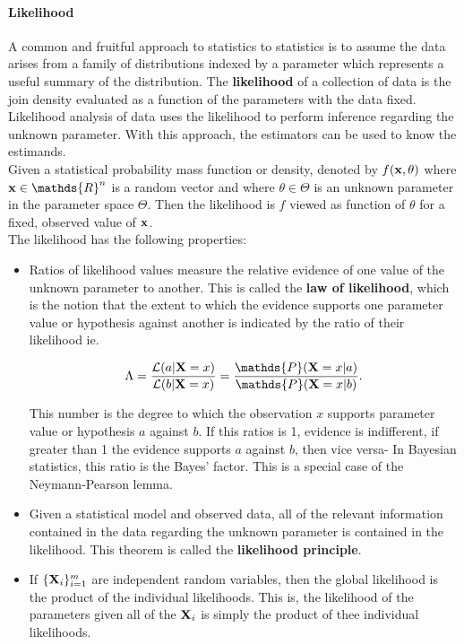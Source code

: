 \documentclass{homework}
\begin{document}
\paragraph{Likelihood}

A common and fruitful approach to statistics to statistics is to assume the data arises from a family of distributions indexed by a parameter which represents a useful summary of the distribution. The \textbf{likelihood} of a collection of data is the join density evaluated as a function of the parameters with the data fixed. Likelihood analysis of data uses the likelihood to perform inference regarding the unknown parameter. With this approach, the estimators can be used to know the estimands. \\

Given a statistical probability mass function or density, denoted by $f({\bf x}, \theta)$ where ${\bf x} \in \mathds{R}^n$ is a random vector and where $\theta \in \Theta$ is an unknown parameter in the parameter space $\Theta$. Then the likelihood is $f$ viewed as function of $\theta$ for a fixed, observed value of ${\bf x}$. \\

The likelihood has the following properties:

\begin{itemize}
    \item Ratios of likelihood values measure the relative evidence of one value of the unknown parameter to another. This is called the \textbf{law of likelihood}, which is the notion that the extent to which the evidence supports one parameter value or hypothesis against another is indicated by the ratio of their likelihood ie.
    
    $$
    \Lambda = \frac{\mathcal{L}(a | {\bf X}=x)}{\mathcal{L}(b | {\bf X}=x)} = \frac{\mathds{P}({\bf X}=x|a)}{\mathds{P}({\bf X}=x|b)}.
    $$
    
    This number is the degree to which the observation $x$ supports parameter value or hypothesis $a$ against $b$. If this ratios is 1, evidence is indifferent, if greater than 1 the evidence supports $a$ against $b$, then vice versa- In Bayesian statistics, this ratio is the Bayes' factor. This is a special case of the Neymann-Pearson lemma. \\
    \item Given a statistical model and observed data, all of the relevant information contained in the data regarding the unknown parameter is contained in the likelihood. This theorem is called the \textbf{likelihood principle}. \\
    \item If $\{{\bf X}_i\}_{i=1}^{m}$ are independent random variables, then the global likelihood is the product of the individual likelihoods. This is, the likelihood of the parameters given all of the ${\bf X}_i$ is simply the product of thee individual likelihoods. \\
\end{itemize}
\end{document}
